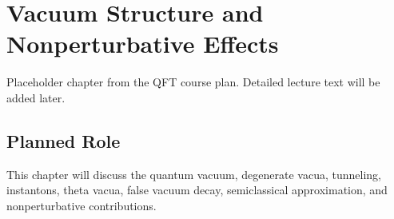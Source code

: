 \chapter{Vacuum Structure and Nonperturbative Effects}

\begin{remarkbox}
Placeholder chapter from the QFT course plan. Detailed lecture text will be added later.
\end{remarkbox}

\section{Planned Role}

This chapter will discuss the quantum vacuum, degenerate vacua, tunneling, instantons, theta vacua, false vacuum decay, semiclassical approximation, and nonperturbative contributions.
